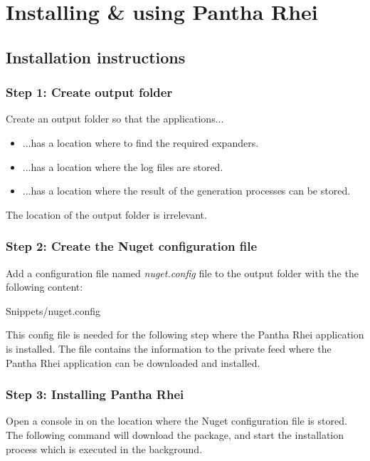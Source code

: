 \chapter{Installing \& using Pantha Rhei} \label{appendix_installation_instructions} 

\section{Installation instructions} \label{appendix_installation_prerequisits}
\subsection*{Step 1: Create output folder}
Create an output folder so that the applications...
\begin{itemize}
    \item ...has a location where to find the required expanders.
    \item ...has a location where the log files are stored.
    \item ...has a location where the result of the generation processes can be stored.
\end{itemize}

The location of the output folder is irrelevant.

\subsection*{Step 2: Create the Nuget configuration file}
Add a configuration file named \emph{nuget.config} file to the output folder with the
the following content: 

 {Snippets/nuget.config}

This config file is needed for the following step where the Pantha Rhei application is
installed. The file contains the information to the private feed where the Pantha Rhei
application can be downloaded and installed.

\subsection*{Step 3: Installing Pantha Rhei} \label{appendix_installing_pantha_rhei} 
Open a console in on the location where the Nuget configuration file is stored. The
following command will download the package, and start the installation process which is
executed in the background. 

